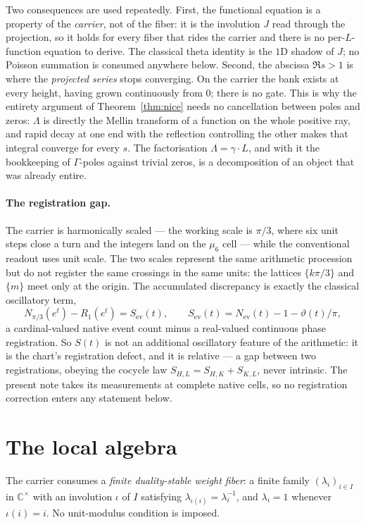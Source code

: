 \documentclass[11pt]{article}
\begin{document}
Two consequences are used repeatedly. First, the functional equation is a property of the
\emph{carrier}, not of the fiber: it is the involution $J$ read through the projection, so it
holds for every fiber that rides the carrier and there is no per-$L$-function equation to derive.
The classical theta identity is the $1$D shadow of $J$; no Poisson summation is consumed anywhere
below. Second, the abscissa $\Re s>1$ is where the \emph{projected series} stops converging. On
the carrier the bank exists at every height, having grown continuously from $0$; there is no gate.
This is why the entirety argument of Theorem~\ref{thm:nice} needs no cancellation between poles
and zeros: $\Lambda$ is directly the Mellin transform of a function on the whole positive ray, and
rapid decay at one end with the reflection controlling the other makes that integral converge for
every $s$. The factorisation $\Lambda=\gamma\cdot L$, and with it the bookkeeping of
$\Gamma$-poles against trivial zeros, is a decomposition of an object that was already entire.

\paragraph{The registration gap.} The carrier is harmonically scaled --- the working scale is
$\pi/3$, where six unit steps close a turn and the integers land on the $\mu_6$ cell --- while the
conventional readout uses unit scale. The two scales represent the same arithmetic procession but
do not register the same crossings in the same units: the lattices $\{k\pi/3\}$ and $\{m\}$ meet
only at the origin. The accumulated discrepancy is exactly the classical oscillatory term,
\[
  N_{\pi/3}(e^{t})-R_{1}(e^{t})=S_{\mathrm{ev}}(t),
  \qquad S_{\mathrm{ev}}(t)=N_{\mathrm{ev}}(t)-1-\vartheta(t)/\pi,
\]
a cardinal-valued native event count minus a real-valued continuous phase registration. So
$S(t)$ is not an additional oscillatory feature of the arithmetic: it is the chart's registration
defect, and it is relative --- a gap between two registrations, obeying the cocycle law
$S_{H,L}=S_{H,K}+S_{K,L}$, never intrinsic. The present note takes its measurements at complete
native cells, so no registration correction enters any statement below.

\section{The local algebra}

The carrier consumes a \emph{finite duality-stable weight fiber}: a finite family
$(\lambda_i)_{i\in I}$ in $\mathbb C^\times$ with an involution $\iota$ of $I$ satisfying
$\lambda_{\iota(i)}=\lambda_i^{-1}$, and $\lambda_i=1$ whenever $\iota(i)=i$. No unit-modulus
condition is imposed.
\end{document}
